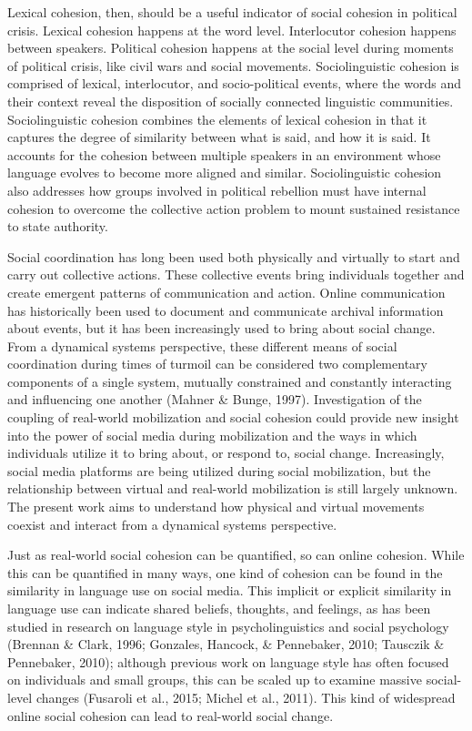 \documentclass[english,man]{apa6}
\begin{document}
Lexical cohesion, then, should be a useful indicator of social cohesion in political crisis. Lexical cohesion happens at the word level. Interlocutor cohesion happens between speakers. Political cohesion happens at the social level during moments of political crisis, like civil wars and social movements. Sociolinguistic cohesion is comprised of lexical, interlocutor, and socio-political events, where the words and their context reveal the disposition of socially connected linguistic communities. Sociolinguistic cohesion combines the elements of lexical cohesion in that it captures the degree of similarity between what is said, and how it is said. It accounts for the cohesion between multiple speakers in an environment whose language evolves to become more aligned and similar. Sociolinguistic cohesion also addresses how groups involved in political rebellion must have internal cohesion to overcome the collective action problem to mount sustained resistance to state authority.

Social coordination has long been used both physically and virtually
to start and carry out collective actions. These collective events
bring individuals together and create emergent patterns of communication
and action. Online communication has historically been used to document
and communicate archival information about events, but it has been
increasingly used to bring about social change. From a dynamical
systems perspective, these different means of social coordination during
times of turmoil can be considered two complementary components of a
single system, mutually constrained and constantly interacting and
influencing one another (Mahner \& Bunge, 1997). Investigation of the
coupling of real-world mobilization and social cohesion could provide
new insight into the power of social media during mobilization and the
ways in which individuals utilize it to bring about, or respond to, social
change. Increasingly, social media platforms are being utilized during
social mobilization, but the relationship between virtual and real-world
mobilization is still largely unknown. The present work aims to understand
how physical and virtual movements coexist and interact from a dynamical
systems perspective.

Just as real-world social cohesion can be
quantified, so can online cohesion. While this can be quantified in many ways,
one kind of cohesion can be found in the similarity in language use on social media.
This implicit or explicit similarity in language use can indicate shared
beliefs, thoughts, and feelings, as has been studied in research on language style
in psycholinguistics and social psychology
(Brennan \& Clark, 1996; Gonzales, Hancock, \& Pennebaker, 2010; Tausczik \& Pennebaker, 2010);
although previous work on language style
has often focused on individuals and small groups, this can be scaled up to examine
massive social-level changes (Fusaroli et al., 2015; Michel et al., 2011).
This kind of widespread online social cohesion can lead to real-world
social change.
\end{document}
